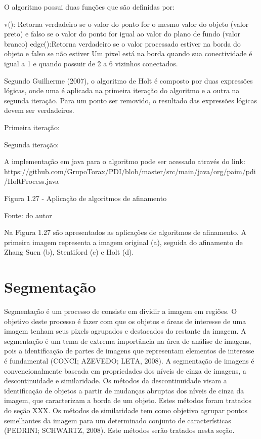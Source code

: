 \documentclass[
	12pt,				%
	oneside,			%
	a4paper,			%
	english,			%
	french,				%
	spanish,			%
	brazil,				%
	]{abntex2}
\begin{document}
	O algoritmo possui duas funções que são definidas por:

v(): Retorna verdadeiro se o valor do ponto for o mesmo valor do objeto (valor preto) e falso se o valor do ponto for igual ao valor do plano de fundo (valor branco)
edge():Retorna verdadeiro se o valor processado estiver na borda do objeto e falso se não estiver
Um pixel está na borda quando sua conectividade é igual a 1 e quando possuir de 2 a 6 vizinhos conectados. 

	Segundo Guilherme (2007), o algoritmo de Holt é composto por duas expressões lógicas, onde uma é aplicada na primeira iteração do algoritmo e a outra na segunda iteração. Para um ponto ser removido, o resultado das expressões lógicas devem ser verdadeiros.

Primeira iteração: 

 Segunda iteração:

 A implementação em java para o algoritmo pode ser acessado através do link:
https://github.com/GrupoTorax/PDI/blob/master/src/main/java/org/paim/pdi/HoltProcess.java 

Figura 1.27 - Aplicação de algoritmos de afinamento

Fonte: do autor

Na Figura 1.27 são apresentados as aplicações de algoritmos de afinamento. A primeira imagem representa a imagem original (a), seguida do afinamento de Zhang Suen (b), Stentiford (c) e Holt (d). 
   
\section{Segmentação}  

	Segmentação é um processo de consiste em dividir a imagem em regiões. O objetivo deste processo é fazer com que os objetos e áreas de interesse de uma imagem tenham seus pixels agrupados e destacados do restante da imagem. A segmentação é um tema de extrema importância na área de análise de imagens, pois a identificação de partes de imagens que representam elementos de interesse é fundamental (CONCI; AZEVEDO; LETA, 2008).  
	A segmentação de imagens é convencionalmente baseada em propriedades dos níveis de cinza de imagens, a descontinuidade e similaridade. Os métodos da descontinuidade visam a identificação de objetos a partir de mudanças abruptas dos níveis de cinza da imagem, que caracterizam a borda de um objeto. Estes métodos foram tratados do seção XXX. Os métodos de similaridade tem como objetivo agrupar pontos semelhantes da imagem para um determinado conjunto de características (PEDRINI; SCHWARTZ, 2008). Este métodos serão tratados nesta seção.
    
\end{document}
